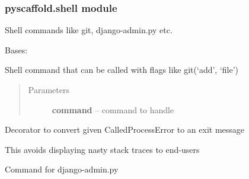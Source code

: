 \documentclass[letterpaper,10pt,english]{sphinxmanual}
\begin{document}
\subsubsection{pyscaffold.shell module}
\label{_rst/pyscaffold:pyscaffold-shell-module}\label{_rst/pyscaffold:module-pyscaffold.shell}
Shell commands like git, django-admin.py etc.

\begin{fulllineitems}
\label{_rst/pyscaffold:pyscaffold.shell.Command}
Bases: 

Shell command that can be called with flags like git(`add', `file')
\begin{quote}\begin{description}
\item[{Parameters}] \leavevmode
\textbf{command} -- command to handle

\end{description}\end{quote}

\end{fulllineitems}


\begin{fulllineitems}
\label{_rst/pyscaffold:pyscaffold.shell.called_process_error2exit_decorator}
Decorator to convert given CalledProcessError to an exit message

This avoids displaying nasty stack traces to end-users

\end{fulllineitems}


\begin{fulllineitems}
\label{_rst/pyscaffold:pyscaffold.shell.django_admin}
Command for django-admin.py

\end{fulllineitems}

\end{document}
